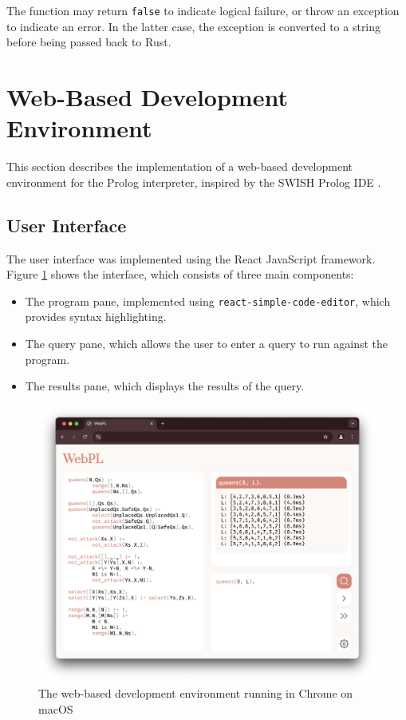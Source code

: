 The function may return \texttt{false} to indicate logical failure, or throw an exception to indicate an error. In the latter case, the exception is converted to a string before being passed back to Rust.

\section{Web-Based Development Environment}

\label{sec:web-dev-env}

This section describes the implementation of a web-based development environment for the Prolog interpreter, inspired by the SWISH Prolog IDE \cite{wielemakerSWISHSWIPrologSharing2015}.

\subsection{User Interface}

The user interface was implemented using the React JavaScript framework. Figure \ref{fig:webpl} shows the interface, which consists of three main components:

\begin{itemize}
\item The program pane, implemented using \texttt{react-simple-code-editor}, which provides syntax highlighting.
\item The query pane, which allows the user to enter a query to run against the program.
\item The results pane, which displays the results of the query.
\end{itemize}

\begin{figure}[H]
\centering
\includegraphics[width=\textwidth]{07implementation_browser.png}
\caption{The web-based development environment running in Chrome on macOS}
\label{fig:webpl}
\end{figure}


